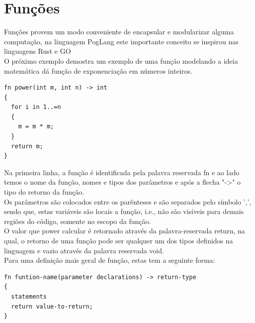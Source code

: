 \documentclass[12pt, letterpaper]{article}
\newcommand\tab[1][1cm]{\hspace*{#1}}
\newcommand\tabd[1][0.3cm]{\hspace*{#1}}
\begin{document}
\begin{spacing}{1.5}
\end{spacing}

\section{Funções}
\tab Funções provem um modo conveniente de encapsular e modularizar alguma computação, 
na linguagem PogLang este importante conceito se inspirou nas linguagens Rust e GO\\[1.0mm]
\tab O próximo exemplo demostra um exemplo de uma função modelando a ideia matemática 
dá função de exponenciação em números inteiros.

\begin{spacing}{1.5}
\end{spacing}

\begin{lstlisting}[caption=Exemplo função power]
fn power(int m, int n) -> int
{
  for i in 1..=n
  {
    m = m * m;
  }
  return m;
}
\end{lstlisting}

\begin{spacing}{1.5}
\end{spacing}

\tabd Na primeira linha, a função é identificada pela palavra reservada fn e ao lado
temos o nome da função, nomes e tipos dos parâmetros e após a flecha "-\textgreater"
o tipo do retorno da função.\\[1.0mm]
\tab Os parâmetros são colocados entre os parênteses e são separados pelo símbolo ',',
sendo que, estas variáveis são locais a função, i.e., não são visíveis para demais 
regiões do código, somente no escopo da função.\\[1.0mm]
\tab O valor que power calcular é retornado através da palavra-reservada return, na qual, 
o retorno de uma função pode ser qualquer um dos tipos definidos na linguagem e 
vazio através da palavra reservada void.\\[1.0mm]
\tab Para uma definição mais geral de função, estas tem a seguinte forma:

\begin{spacing}{1.5}
\end{spacing}

\begin{lstlisting}[caption=Forma geral de funções]
fn funtion-name(parameter declarations) -> return-type
{
  statements
  return value-to-return;
}
\end{lstlisting}
\end{document}
